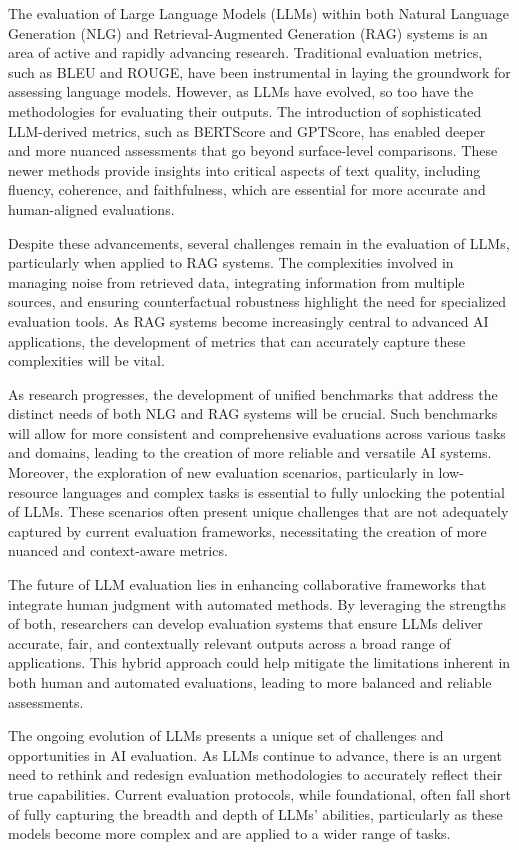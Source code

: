 The evaluation of Large Language Models (LLMs) within both Natural Language Generation (NLG) and Retrieval-Augmented Generation (RAG) systems is an area of active and rapidly advancing research. Traditional evaluation metrics, such as BLEU and ROUGE, have been instrumental in laying the groundwork for assessing language models. However, as LLMs have evolved, so too have the methodologies for evaluating their outputs. The introduction of sophisticated LLM-derived metrics, such as BERTScore and GPTScore, has enabled deeper and more nuanced assessments that go beyond surface-level comparisons. These newer methods provide insights into critical aspects of text quality, including fluency, coherence, and faithfulness, which are essential for more accurate and human-aligned evaluations.

Despite these advancements, several challenges remain in the evaluation of LLMs, particularly when applied to RAG systems. The complexities involved in managing noise from retrieved data, integrating information from multiple sources, and ensuring counterfactual robustness highlight the need for specialized evaluation tools. As RAG systems become increasingly central to advanced AI applications, the development of metrics that can accurately capture these complexities will be vital.

As research progresses, the development of unified benchmarks that address the distinct needs of both NLG and RAG systems will be crucial. Such benchmarks will allow for more consistent and comprehensive evaluations across various tasks and domains, leading to the creation of more reliable and versatile AI systems. Moreover, the exploration of new evaluation scenarios, particularly in low-resource languages and complex tasks is essential to fully unlocking the potential of LLMs. These scenarios often present unique challenges that are not adequately captured by current evaluation frameworks, necessitating the creation of more nuanced and context-aware metrics.

The future of LLM evaluation lies in enhancing collaborative frameworks that integrate human judgment with automated methods. By leveraging the strengths of both, researchers can develop evaluation systems that ensure LLMs deliver accurate, fair, and contextually relevant outputs across a broad range of applications. This hybrid approach could help mitigate the limitations inherent in both human and automated evaluations, leading to more balanced and reliable assessments.

The ongoing evolution of LLMs presents a unique set of challenges and opportunities in AI evaluation. As LLMs continue to advance, there is an urgent need to rethink and redesign evaluation methodologies to accurately reflect their true capabilities. Current evaluation protocols, while foundational, often fall short of fully capturing the breadth and depth of LLMs' abilities, particularly as these models become more complex and are applied to a wider range of tasks.

